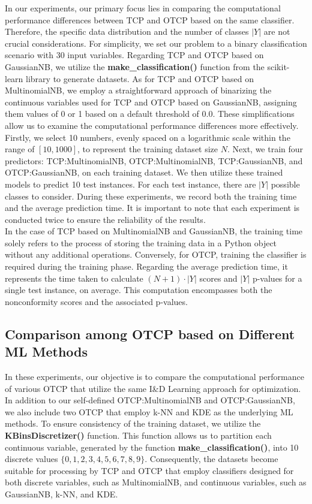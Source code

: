 \documentclass[10pt]{reportMaster}
\begin{document}
In our experiments, our primary focus lies in comparing the computational performance differences between TCP and OTCP based on the same classifier. Therefore, the specific data distribution and the number of classes $|Y|$ are not crucial considerations. For simplicity, we set our problem to a binary classification scenario with 30 input variables. Regarding TCP and OTCP based on GaussianNB, we utilize the \textbf{make\_classification()} function from the scikit-learn library to generate datasets. As for TCP and OTCP based on MultinomialNB, we employ a straightforward approach of binarizing the continuous variables used for TCP and OTCP based on GaussianNB, assigning them values of 0 or 1 based on a default threshold of 0.0. These simplifications allow us to examine the computational performance differences more effectively.\\

\noindent Firstly, we select 10 numbers, evenly spaced on a logarithmic scale within the range of $[10, 1000]$, to represent the training dataset size $N$. Next, we train four predictors: TCP:MultinomialNB, OTCP:MultinomialNB, TCP:GaussianNB, and OTCP:GaussianNB, on each training dataset. We then utilize these trained models to predict 10 test instances. For each test instance, there are $|Y|$ possible classes to consider. During these experiments, we record both the training time and the average prediction time. It is important to note that each experiment is conducted twice to ensure the reliability of the results.\\

\noindent In the case of TCP based on MultinomialNB and GaussianNB, the training time solely refers to the process of storing the training data in a Python object without any additional operations. Conversely, for OTCP, training the classifier is required during the training phase. Regarding the average prediction time, it represents the time taken to calculate $(N+1) \cdot |Y|$ scores and $|Y|$ p-values for a single test instance, on average. This computation encompasses both the nonconformity scores and the associated p-values.

\subsection{Comparison among OTCP based on Different ML Methods}

In these experiments, our objective is to compare the computational performance of various OTCP that utilize the same I\&D Learning approach for optimization. In addition to our self-defined OTCP:MultinomialNB and OTCP:GaussianNB, we also include two OTCP that employ k-NN and KDE as the underlying ML methods. To ensure consistency of the training dataset, we utilize the \textbf{KBinsDiscretizer()} function. This function allows us to partition each continuous variable, generated by the function \textbf{make\_classification()}, into 10 discrete values $\{0, 1, 2, 3, 4, 5, 6, 7, 8, 9\}$. Consequently, the datasets become suitable for processing by TCP and OTCP that employ classifiers designed for both discrete variables, such as MultinomialNB, and continuous variables, such as GaussianNB, k-NN, and KDE.\\
\end{document}
